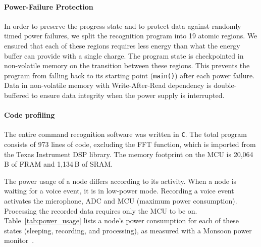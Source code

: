 \paragraph{Power-Failure Protection}
In order to preserve the progress state and to protect \cim data against randomly timed power failures, we split the recognition program into 19 atomic regions. 
We ensured that each of these regions requires less energy than what the energy buffer can provide with a single charge. 
The program state is checkpointed in non-volatile memory on the transition between these regions. This prevents the program from falling back to its starting point (\texttt{main()}) after each power failure. 
Data in non-volatile memory with Write-After-Read dependency is double-buffered to ensure data integrity when the power supply is interrupted.
%
\paragraph{Code profiling}
The entire command recognition software was written in {\tt C}. The total program consists of 973 lines of code, excluding the FFT function, which is imported from the Texas Instrument DSP library.
The memory footprint on the MCU is 20,064\,B of FRAM and 1,134\,B of SRAM.

The power usage of a node differs according to its activity. When a node is waiting for a voice event, it is in low-power mode. Recording a voice event activates the microphone, ADC and MCU (maximum power consumption). Processing the recorded data requires only the MCU to be on. Table~\ref{tab:power_usage} lists a node's power consumption for each of these states (sleeping, recording, and processing), as measured with a Monsoon power monitor~\cite{monsoon}. 
%
%
